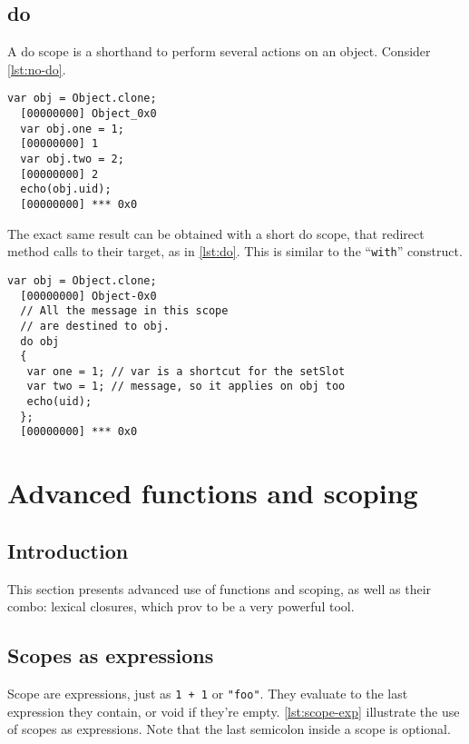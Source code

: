 \documentclass[openright,twoside,12pt]{report}
\newcommand{\lst}[1]{\autoref{lst:#1}}
\begin{document}
\section{do}
\label{section:constructs/do}

A do scope is a shorthand to perform several actions on an
object. Consider \lst{no-do}.

\begin{lstlisting}[caption=Lot of code bloat,label=lst:no-do]
  var obj = Object.clone;
  [00000000] Object_0x0
  var obj.one = 1;
  [00000000] 1
  var obj.two = 2;
  [00000000] 2
  echo(obj.uid);
  [00000000] *** 0x0
\end{lstlisting}

The exact same result can be obtained with a short do scope, that
redirect method calls to their target, as in \lst{do}. This is similar
to the \pascal ``\texttt{with}'' construct.


\begin{lstlisting}[caption=Shorter with a do block,label=lst:do]
  var obj = Object.clone;
  [00000000] Object-0x0
  // All the message in this scope
  // are destined to obj.
  do obj
  {
   var one = 1; // var is a shortcut for the setSlot
   var two = 1; // message, so it applies on obj too
   echo(uid);
  };
  [00000000] *** 0x0
\end{lstlisting}



\chapter{Advanced functions and scoping}

\section{Introduction}

This section presents advanced use of functions and scoping, as well
as their combo: lexical closures, which prov to be a very powerful
tool.

\section{Scopes as expressions}

Scope are expressions, just as \lstinline|1 + 1| or \lstinline|"foo"|.
They evaluate to the last expression they contain, or void if they're
empty. \lst{scope-exp} illustrate the use of scopes as
expressions. Note that the last semicolon inside a scope is optional.
\end{document}
